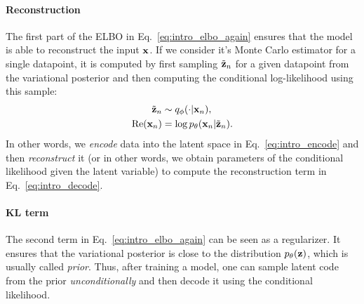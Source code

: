 \paragraph{Reconstruction}
The first part of the ELBO in Eq.~\ref{eq:intro_elbo_again} ensures that the model is able to reconstruct the input ${\mathbf{x}}$. If we consider it's Monte Carlo estimator for a single datapoint, it is computed by first sampling $\tilde{{\mathbf{z}}}_n$ for a given datapoint from the variational posterior
and then computing the conditional log-likelihood using this sample: 
\begin{align}
    \tilde{\rvz}_n &\sim q_{\phi}(\cdot|\rvx_n), \label{eq:intro_encode}\\
    \text{Re}(\rvx_n) &= \log p_{\theta}(\rvx_n|\tilde{\rvz}_n).\label{eq:intro_decode}
\end{align}
In other words, we \textit{encode} data into the latent space in Eq.~\ref{eq:intro_encode} and then \textit{reconstruct} it (or in other words, we obtain parameters of the conditional likelihood given the latent variable) to compute the reconstruction term in Eq.~\ref{eq:intro_decode}.

\paragraph{KL term}
The second term in Eq.~\ref{eq:intro_elbo_again} can be seen as a regularizer. It ensures that the variational posterior is close to the distribution $p_{\theta}({\mathbf{z}})$, which is usually called \textit{prior}.
Thus, after training a model, one can sample latent code from the prior \textit{unconditionally} and then decode it using the conditional likelihood. 

